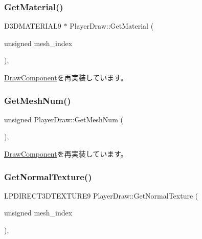 \mbox{\label{class_player_draw_abcc7b934dbbe08215291dfd1baa2ac31}} 
\subsubsection{\texorpdfstring{Get\+Material()}{GetMaterial()}}
{\footnotesize\ttfamily D3\+D\+M\+A\+T\+E\+R\+I\+A\+L9 $\ast$ Player\+Draw\+::\+Get\+Material (\begin{DoxyParamCaption}\item[{unsigned}]{mesh\+\_\+index }\end{DoxyParamCaption})\hspace{0.3cm}{\ttfamily [override]}, {\ttfamily [virtual]}}



\mbox{\hyperlink{class_draw_component_adae078d5139f691997763bf6cac9e25a}{Draw\+Component}}を再実装しています。

\mbox{\label{class_player_draw_adbf5776a7a2d7f255661e0527f673eaa}} 
\subsubsection{\texorpdfstring{Get\+Mesh\+Num()}{GetMeshNum()}}
{\footnotesize\ttfamily unsigned Player\+Draw\+::\+Get\+Mesh\+Num (\begin{DoxyParamCaption}{ }\end{DoxyParamCaption})\hspace{0.3cm}{\ttfamily [override]}, {\ttfamily [virtual]}}



\mbox{\hyperlink{class_draw_component_a5f3bbcc8e563b740c0a5535170921c75}{Draw\+Component}}を再実装しています。

\mbox{\label{class_player_draw_a96eb31c32c0016cd6c908dc67032a7ed}} 
\subsubsection{\texorpdfstring{Get\+Normal\+Texture()}{GetNormalTexture()}}
{\footnotesize\ttfamily L\+P\+D\+I\+R\+E\+C\+T3\+D\+T\+E\+X\+T\+U\+R\+E9 Player\+Draw\+::\+Get\+Normal\+Texture (\begin{DoxyParamCaption}\item[{unsigned}]{mesh\+\_\+index }\end{DoxyParamCaption})\hspace{0.3cm}{\ttfamily [override]}, {\ttfamily [virtual]}}



